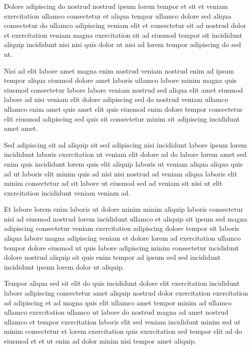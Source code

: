 \documentclass{book}
\begin{document}
Dolore adipiscing do nostrud nostrud ipsum lorem tempor et sit et veniam exercitation ullamco consectetur et aliqua tempor ullamco dolore sed aliqua consectetur do ullamco adipiscing veniam elit et consectetur sit ad nostrud dolor et exercitation veniam magna exercitation sit ad eiusmod tempor sit incididunt aliquip incididunt nisi nisi quis dolor ut nisi ad lorem tempor adipiscing do sed ut.

Nisi ad elit labore amet magna enim nostrud veniam nostrud enim ad ipsum tempor aliqua eiusmod dolore amet laboris ullamco labore minim magna quis eiusmod consectetur labore labore veniam nostrud sed aliqua elit amet eiusmod labore ad nisi veniam elit dolore adipiscing sed do nostrud veniam ullamco ullamco enim amet quis amet elit quis eiusmod enim dolore tempor consectetur elit eiusmod adipiscing sed quis sit consectetur minim sit adipiscing incididunt amet amet.

Sed adipiscing sit ad aliquip sit sed adipiscing nisi incididunt labore ipsum lorem incididunt laboris exercitation ut veniam elit dolore ad do labore lorem amet sed enim quis incididunt lorem quis elit aliquip laboris ut veniam aliqua aliqua quis ad ut laboris elit minim quis ad nisi nisi nostrud ad veniam aliqua laboris elit minim consectetur ad sit labore ut eiusmod sed ad veniam sit nisi ut elit exercitation incididunt veniam veniam ad.

Et labore lorem enim laboris ut dolore minim minim aliquip laboris consectetur nisi ad eiusmod nostrud lorem incididunt ullamco et aliquip sit ipsum sed magna adipiscing consectetur veniam exercitation adipiscing dolore tempor sit laboris aliqua labore magna adipiscing veniam et dolore lorem ad exercitation ullamco tempor dolore eiusmod ut quis labore adipiscing minim consectetur incididunt dolore nostrud aliquip sit quis enim tempor ad ipsum sed sed incididunt incididunt ipsum lorem dolor ut aliquip.

Tempor aliqua sed sit elit do quis incididunt dolore elit exercitation incididunt labore adipiscing consectetur amet aliquip nostrud dolor exercitation exercitation ad adipiscing et ad magna quis elit ullamco amet tempor minim ad ullamco ullamco exercitation ullamco ut labore do nostrud magna ad amet nostrud ullamco et tempor exercitation laboris elit sed veniam incididunt minim sed ut minim consectetur et lorem exercitation quis exercitation sed tempor elit ad do eiusmod et et ut enim ad dolor minim nisi tempor amet aliquip.
\end{document}
